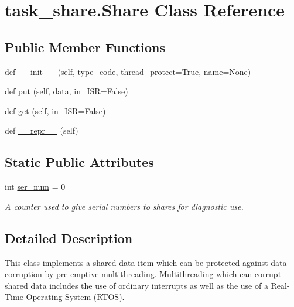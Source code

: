 \hypertarget{classtask__share_1_1_share}{}\section{task\+\_\+share.\+Share Class Reference}
\label{classtask__share_1_1_share}
\subsection*{Public Member Functions}
\begin{DoxyCompactItemize}
\item 
def \mbox{\hyperlink{classtask__share_1_1_share_a3139fd0c5d1df7fc15e003892d557b9a}{\+\_\+\+\_\+init\+\_\+\+\_\+}} (self, type\+\_\+code, thread\+\_\+protect=True, name=None)
\item 
def \mbox{\hyperlink{classtask__share_1_1_share_ab449c261f259db176ffeea55ccbf5d96}{put}} (self, data, in\+\_\+\+I\+SR=False)
\item 
def \mbox{\hyperlink{classtask__share_1_1_share_a599cd89ed1cd79af8795a51d8de70d27}{get}} (self, in\+\_\+\+I\+SR=False)
\item 
def \mbox{\hyperlink{classtask__share_1_1_share_a09c1c075ae99ea33030dd9de7b9ae470}{\+\_\+\+\_\+repr\+\_\+\+\_\+}} (self)
\end{DoxyCompactItemize}
\subsection*{Static Public Attributes}
\begin{DoxyCompactItemize}
\item 
int \mbox{\hyperlink{classtask__share_1_1_share_a2e8df029af46fbfd44ef0c2e7e8c7af6}{ser\+\_\+num}} = 0
\begin{DoxyCompactList}\small\item\em A counter used to give serial numbers to shares for diagnostic use. \end{DoxyCompactList}\end{DoxyCompactItemize}


\subsection{Detailed Description}
\begin{DoxyVerb}This class implements a shared data item which can be protected 
against data corruption by pre-emptive multithreading. Multithreading 
which can corrupt shared data includes the use of ordinary interrupts as 
well as the use of a Real-Time Operating System (RTOS). \end{DoxyVerb}
 

